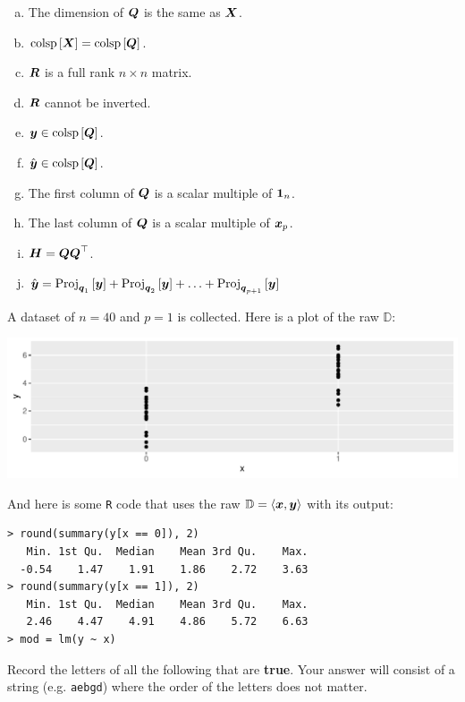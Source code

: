 \documentclass[12pt]{article}
\begin{document}
\begin{enumerate}[(a)]
\item The dimension of $\boldsymbol{Q}$ is the same as $\boldsymbol{X}$.
\item $\text{colsp}\left[\boldsymbol{X}\right] = \text{colsp}\left[\boldsymbol{Q}\right]$.
\item $\boldsymbol{R}$ is a full rank $n \times n$ matrix.
\item $\boldsymbol{R}$ cannot be inverted.
\item $\boldsymbol{y} \in \text{colsp}\left[\boldsymbol{Q}\right]$.
\item $\hat{\boldsymbol{y}} \in \text{colsp}\left[\boldsymbol{Q}\right]$.
\item The first column of $\boldsymbol{Q}$ is a scalar multiple of $\boldsymbol{1}_n$.
\item The last column of $\boldsymbol{Q}$ is a scalar multiple of $\boldsymbol{x}_p$.
\item $\boldsymbol{H} = \boldsymbol{Q}\boldsymbol{Q}^\top$.
\item $\hat{\boldsymbol{y}} = \text{Proj}_{\boldsymbol{q}_1}\left[\boldsymbol{y}\right] + \text{Proj}_{\boldsymbol{q}_2}\left[\boldsymbol{y}\right] + \ldots + \text{Proj}_{\boldsymbol{q}_{p+1}}\left[\boldsymbol{y}\right]$
\end{enumerate}
\eenum\pagebreak


\problem [14min] A dataset of $n = 40$ and $p=1$ is collected. Here is a plot of the raw $\mathbb{D}$:

\beqn
\centering\includegraphics[width=6in]{binary.pdf}
\eeqn

And here is some \texttt{R} code that uses the raw $\mathbb{D} = \left<\boldsymbol{x},\boldsymbol{y}\right>$ with its output:

\begin{lstlisting}
> round(summary(y[x == 0]), 2)
   Min. 1st Qu.  Median    Mean 3rd Qu.    Max. 
  -0.54    1.47    1.91    1.86    2.72    3.63 
> round(summary(y[x == 1]), 2)
   Min. 1st Qu.  Median    Mean 3rd Qu.    Max. 
   2.46    4.47    4.91    4.86    5.72    6.63 
> mod = lm(y ~ x)
\end{lstlisting}
\vspace{-1cm}
\benum

 Record the letters of all the following that are \textbf{true}. Your answer will consist of a string (e.g. \texttt{aebgd}) where the order of the letters does not matter.
\end{document}
